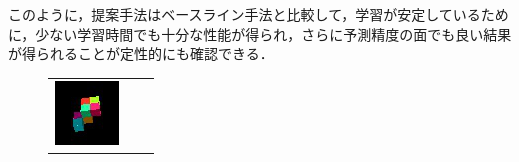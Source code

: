 このように，提案手法はベースライン手法と比較して，学習が安定しているために，少ない学習時間でも十分な性能が得られ，さらに予測精度の面でも良い結果が得られることが定性的にも確認できる．

\begin{figure}[tbp]
  \begin{center}
    \begin{tabular}{ccc}
      \begin{minipage}{0.2\linewidth}
        \begin{center}
          \includegraphics[width=\linewidth]{./figures/context_1.png}
        \end{center}
      \end{minipage} &
      \begin{minipage}{0.2\linewidth}
        \begin{center}

\end{center}
\end{minipage}
\end{tabular}
\end{center}
\end{figure}

